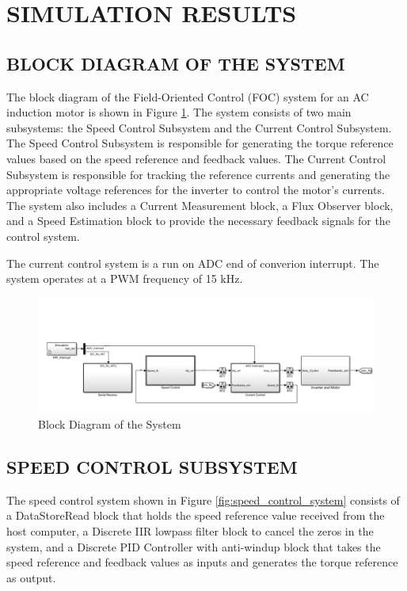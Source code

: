 \section{SIMULATION RESULTS}

\subsection{BLOCK DIAGRAM OF THE SYSTEM}



The block diagram of the Field-Oriented Control (FOC) system for an AC induction motor is shown in Figure \ref{fig:block_diagram}. The system consists of two main subsystems: the Speed Control Subsystem and the Current Control Subsystem. The Speed Control Subsystem is responsible for generating the torque reference values based on the speed reference and feedback values. The Current Control Subsystem is responsible for tracking the reference currents and generating the appropriate voltage references for the inverter to control the motor's currents. The system also includes a Current Measurement block, a Flux Observer block, and a Speed Estimation block to provide the necessary feedback signals for the control system.


The current control system is a run on ADC end of converion interrupt. The system operates at a PWM frequency of 15 kHz.

\begin{figure}[H]
	\centering
	\includegraphics[width=6in]{sections/section3/images/simulation/blockDia.png}
	\caption{Block Diagram of the System}
	\label{fig:block_diagram}
\end{figure}


\subsection{SPEED CONTROL SUBSYSTEM}

The speed control system shown in Figure \ref{fig:speed_control_system} consists of a DataStoreRead block that holds the speed reference value received from the host computer, a Discrete IIR lowpass filter block to cancel the zeros in the system, and a Discrete PID Controller with anti-windup block that takes the speed reference and feedback values as inputs and generates the torque reference as output. 

